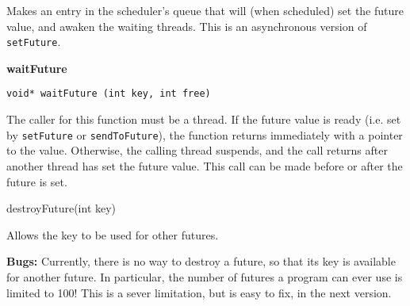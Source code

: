 Makes an entry in the scheduler's queue that will (when scheduled) set
the future value, and awaken the waiting threads. This is an
asynchronous version of \verb#setFuture#. 


{\large \bf  waitFuture}

\verb#void* waitFuture (int key, int free)#

The caller for this function must be a thread. If the future value is
ready (i.e. set by \verb#setFuture# or \verb#sendToFuture#), the
function returns immediately with a pointer to the value. Otherwise,
the calling thread suspends, and the call returns after another thread
has set the future value. This call can be made before or after the future
is set.

destroyFuture(int key)

Allows  the key to be used for other futures.

{\large \bf Bugs:} Currently, there is no way to destroy a future, so that its key
is available for another future. In particular, the number of futures
a program can ever use is limited to 100! This is a sever limitation,
but is easy to fix, in the next version.


